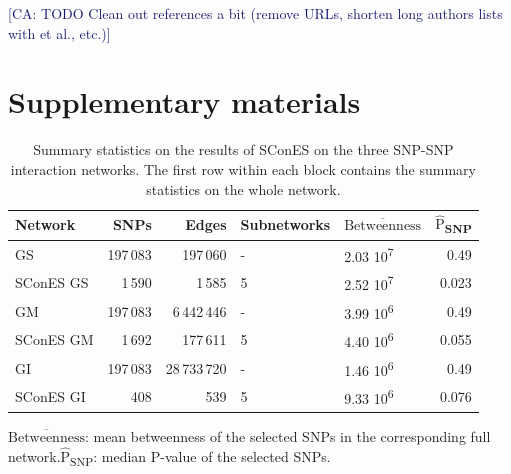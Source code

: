 \documentclass[twocolumn, 11pt]{article}
\newcommand{\mean}[1]{$\overline{\mbox{#1}}$}
\newcommand{\median}[1]{$\hat{\mbox{#1}}$}
\newcommand{\cazcom}[2]{{\uline{#1}}\unskip\space\textcolor{MidnightBlue}{[CA: #2]}}
\begin{document}
\cazcom{}{TODO Clean out references a bit (remove URLs, shorten long authors lists with et al., etc.)}




\clearpage
\setcounter{figure}{0}
\setcounter{section}{0}
\setcounter{table}{0}

\section{Supplementary materials}

\begin{table}[htbp]
\begin{threeparttable}
\caption{\label{tab:snp_solutions}
Summary statistics on the results of SConES on the three SNP-SNP interaction networks. The first row within each block contains the summary statistics on the whole network.}
\centering
\begin{tabular}{lrrllr}
Network & SNPs & Edges & Subnetworks & \mean{Betweenness} & \median{P}\textsubscript{SNP}\\
\hline
GS & 197\,083 & 197\,060 & - & 2.03 \texttimes{} 10\textsuperscript{7} & 0.49\\
SConES GS & 1\,590 & 1\,585 & 5 & 2.52 \texttimes{} 10\textsuperscript{7} & 0.023\\
\hline
GM & 197\,083 & 6\,442\,446 & - & 3.99 \texttimes{} 10\textsuperscript{6} & 0.49\\
SConES GM & 1\,692 & 177\,611 & 5 & 4.40 \texttimes{} 10\textsuperscript{6} & 0.055\\
\hline
GI & 197\,083 & 28\,733\,720 & - & 1.46 \texttimes{} 10\textsuperscript{6} & 0.49\\
SConES GI & 408 & 539 & 5 & 9.33 \texttimes{} 10\textsuperscript{6} & 0.076\\
\end{tabular}
\begin{tablenotes}
  \footnotesize{
    \item \mean{Betweenness}: mean betweenness of the selected SNPs in the corresponding full network.\median{P}\textsubscript{SNP}: median P-value of the selected SNPs.
  }
\end{tablenotes}
\end{threeparttable}
\end{table}
\end{document}
